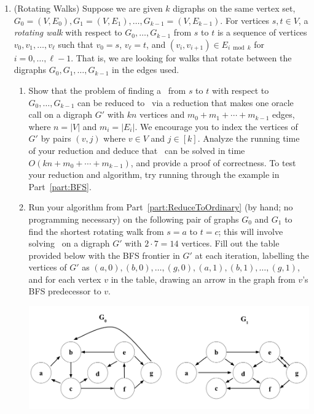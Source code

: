 \documentclass[11pt]{article}
\begin{document}
\begin{enumerate}
   \item  (Rotating Walks)  
    Suppose we are given $k$ digraphs on the same vertex set, $G_0=(V,E_0), G_1=(V,E_1), \ldots, G_{k-1}=(V,E_{k-1})$.  For vertices $s,t\in V$, a {\em rotating walk} with respect to $G_0,\ldots,G_{k-1}$ from $s$ to $t$ is a sequence of vertices $v_0,v_1,\ldots,v_{\ell}$ such that $v_0=s$, $v_\ell=t$, and $(v_i,v_{i+1})\in E_{i \bmod k}$ for $i=0,\ldots,\ell-1$.  That is, we are looking for walks that rotate between the digraphs $G_0,G_1,\ldots,G_{k-1}$ in the edges used.
    \begin{enumerate}
        \item Show that the problem of finding a \ShortestRotatingWalk\ from $s$ to $t$ with respect to $G_0,\ldots,G_{k-1}$ 
        can be reduced to \SingleSourceShortestPaths\ via a reduction that makes one oracle call on 
        a digraph $G'$ with $kn$ vertices and $m_0+m_1+\cdots+m_{k-1}$ edges, where $n=|V|$ and $m_i=|E_i|$.
        We encourage you to index the vertices of $G'$ by pairs $(v,j)$ where $v\in V$ and $j\in [k]$. 
        Analyze the running time of your reduction and deduce that \ShortestRotatingWalk\ can be solved in time $O(kn+m_0+\cdots+m_{k-1})$, and provide a proof of correctness.
        \label{part:ReduceToOrdinary}  To test your reduction and algorithm, try running through the example in Part~\ref{part:BFS}.


        

        
        


        \item \label{part:BFS} 
   
        Run your algorithm from Part~\ref{part:ReduceToOrdinary} (by hand; no programming necessary) on the following pair of graphs $G_0$ and $G_1$ to find the shortest rotating walk from $s=a$ to $t=c$; this will involve solving \SingleSourceShortestPaths\ on a digraph $G'$ with $2\cdot 7=14$ vertices. Fill out the table provided below with the BFS frontier in $G'$ at each iteration, labelling the vertices of $G'$ as $(a, 0),(b, 0),\ldots,(g,0),(a,1),(b,1),\ldots,(g,1)$, and for each vertex $v$ in the table, drawing an arrow in the graph from $v$'s BFS predecessor to $v$. 


            \includegraphics[width=14cm]{ps5_graph.png}





\end{enumerate}
\end{enumerate}
\end{document}
